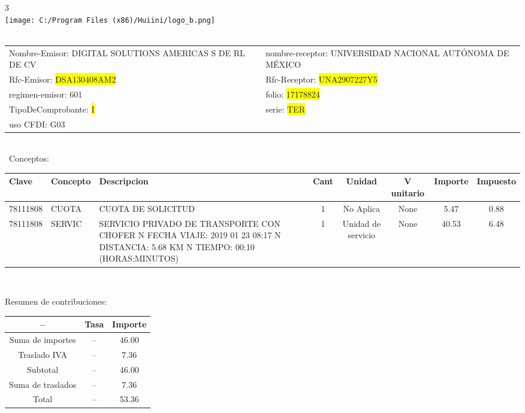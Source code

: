 \documentclass{article}
\begin{document}
\hspace{18cm} 3\\
\texttt{[image: C:/Program Files (x86)/Huiini/logo\_b.png]}
\bigskip\\\
\begin{tabular}{p{11cm}p{1cm}p{8cm}}

Nombre-Emisor: DIGITAL SOLUTIONS AMERICAS S DE RL DE CV && nombre-receptor: UNIVERSIDAD NACIONAL AUTÓNOMA DE MÉXICO\\

Rfc-Emisor: \colorbox{yellow}{ DSA130408AM2 } & & Rfc-Receptor: \colorbox{yellow}{ UNA2907227Y5 }\\

regimen-emisor: 601 & & folio: \colorbox{yellow}{ 17178824 }\\

TipoDeComprobante: \colorbox{yellow}{ I } & & serie: \colorbox{yellow}{ TER }\\

uso CFDI: G03\\



\end{tabular}
\bigskip\bigskip\bigskip\\\
Conceptos:\\
\begin{tabular}{|p{1.5cm}|p{3.6cm}|p{3.6cm}|c|c|c|c|c|}
\hline
Clave & Concepto & Descripcion & Cant & Unidad & V unitario & Importe & Impuesto \\
\hline

78111808 & CUOTA  & CUOTA DE SOLICITUD & 1 & No Aplica & None & 5.47 &  0.88 \\
\hline

78111808 & SERVIC & SERVICIO PRIVADO DE TRANSPORTE CON CHOFER  N FECHA VIAJE: 2019 01 23 08:17  N DISTANCIA: 5.68 KM  N TIEMPO: 00:10 (HORAS:MINUTOS) & 1 & Unidad de servicio & None & 40.53 &  6.48 \\
\hline

\end{tabular}\\
\bigskip
\begin{center}
Resumen de contribuciones:\\
\bigskip
\begin{tabular}{|c|c|c|}
\hline
 -- & Tasa & Importe\\
\hline

Suma de importes & -- & 46.00 \\
\hline

Traslado IVA & -- & 7.36 \\
\hline

Subtotal  & -- & 46.00 \\
\hline

Suma de traslados & -- & 7.36 \\
\hline

Total  & -- & 53.36 \\
\hline

\end{tabular}
\end{center}
\end{document}
